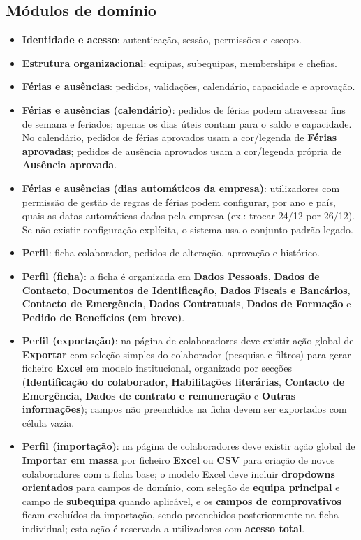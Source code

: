 \documentclass[11pt,a4paper]{article}
\begin{document}
\subsection{Módulos de domínio}
\begin{itemize}
  \item \textbf{Identidade e acesso}: autenticação, sessão, permissões e escopo.
  \item \textbf{Estrutura organizacional}: equipas, subequipas, memberships e chefias.
  \item \textbf{Férias e ausências}: pedidos, validações, calendário, capacidade e aprovação.
  \item \textbf{Férias e ausências (calendário)}: pedidos de férias podem atravessar fins de semana e feriados; apenas os dias úteis contam para o saldo e capacidade. No calendário, pedidos de férias aprovados usam a cor/legenda de \textbf{Férias aprovadas}; pedidos de ausência aprovados usam a cor/legenda própria de \textbf{Ausência aprovada}.
  \item \textbf{Férias e ausências (dias automáticos da empresa)}: utilizadores com permissão de gestão de regras de férias podem configurar, por ano e país, quais as datas automáticas dadas pela empresa (ex.: trocar 24/12 por 26/12). Se não existir configuração explícita, o sistema usa o conjunto padrão legado.
  \item \textbf{Perfil}: ficha colaborador, pedidos de alteração, aprovação e histórico.
  \item \textbf{Perfil (ficha)}: a ficha é organizada em \textbf{Dados Pessoais}, \textbf{Dados de Contacto}, \textbf{Documentos de Identificação}, \textbf{Dados Fiscais e Bancários}, \textbf{Contacto de Emergência}, \textbf{Dados Contratuais}, \textbf{Dados de Formação} e \textbf{Pedido de Benefícios (em breve)}.
  \item \textbf{Perfil (exportação)}: na página de colaboradores deve existir ação global de \textbf{Exportar} com seleção simples do colaborador (pesquisa e filtros) para gerar ficheiro \textbf{Excel} em modelo institucional, organizado por secções (\textbf{Identificação do colaborador}, \textbf{Habilitações literárias}, \textbf{Contacto de Emergência}, \textbf{Dados de contrato e remuneração} e \textbf{Outras informações}); campos não preenchidos na ficha devem ser exportados com célula vazia.
  \item \textbf{Perfil (importação)}: na página de colaboradores deve existir ação global de \textbf{Importar em massa} por ficheiro \textbf{Excel} ou \textbf{CSV} para criação de novos colaboradores com a ficha base; o modelo Excel deve incluir \textbf{dropdowns orientados} para campos de domínio, com seleção de \textbf{equipa principal} e campo de \textbf{subequipa} quando aplicável, e os \textbf{campos de comprovativos} ficam excluídos da importação, sendo preenchidos posteriormente na ficha individual; esta ação é reservada a utilizadores com \textbf{acesso total}.

\end{itemize}
\end{document}
